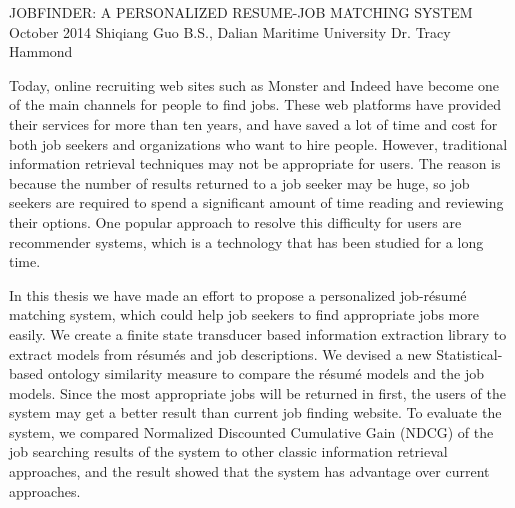 \begingroup
\absone
{JOBFINDER: A PERSONALIZED RESUME-JOB MATCHING SYSTEM}
{October 2014}
{Shiqiang Guo}
{B.S., Dalian Maritime University}  %
{Dr. Tracy Hammond}%
{
Today, online recruiting web sites such as Monster and Indeed have become one of the main channels for people to find jobs. These web platforms have provided their services for more than ten years, and have saved a lot of time and cost for both job seekers and organizations who want to hire people. However, traditional information retrieval techniques may not be appropriate for users. The reason is because the number of results returned to a job seeker may be huge, so job seekers are required to spend a significant amount of time reading and reviewing their options. One popular approach to resolve this difficulty for users are recommender systems, which is a technology that has been studied for a long time.

In this thesis we have made an effort to propose a personalized job-r\'esum\'e matching system, which could help job seekers to find appropriate jobs more easily.  We create a finite state transducer based information extraction library to extract models from r\'esum\'es and job descriptions. We devised a new Statistical-based ontology similarity measure to compare the r\'esum\'e models and the job models. Since the most appropriate jobs will be returned in first, the users of the system may get a better result than current job finding website. To evaluate the system, we compared Normalized Discounted Cumulative Gain (NDCG) of the job searching results of the system to other classic information retrieval approaches, and the result showed that the system has  \? advantage over current approaches.

}
\endgroup



